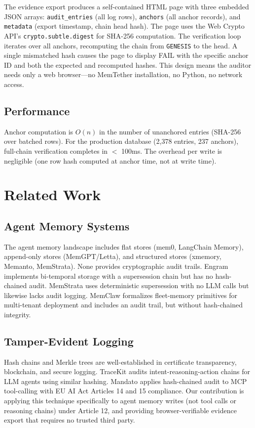 \documentclass[sigconf,nonacm]{acmart}
\begin{document}
The evidence export produces a self-contained HTML page with three embedded JSON arrays: \texttt{audit\_entries} (all log rows), \texttt{anchors} (all anchor records), and \texttt{metadata} (export timestamp, chain head hash). The page uses the Web Crypto API's \texttt{crypto.subtle.digest} for SHA-256 computation. The verification loop iterates over all anchors, recomputing the chain from \texttt{GENESIS} to the head. A single mismatched hash causes the page to display FAIL with the specific anchor ID and both the expected and recomputed hashes. This design means the auditor needs only a web browser---no MemTether installation, no Python, no network access.

\subsection{Performance}
Anchor computation is $O(n)$ in the number of unanchored entries (SHA-256 over batched rows). For the production database (2,378 entries, 237 anchors), full-chain verification completes in $<$ 100ms. The overhead per write is negligible (one row hash computed at anchor time, not at write time).

\section{Related Work}

\subsection{Agent Memory Systems}
The agent memory landscape includes flat stores (mem0, LangChain Memory), append-only stores (MemGPT/Letta), and structured stores (xmemory, Memanto, MemStrata). None provides cryptographic audit trails. Engram implements bi-temporal storage with a supersession chain but has no hash-chained audit. MemStrata uses deterministic supersession with no LLM calls but likewise lacks audit logging. MemClaw formalizes fleet-memory primitives for multi-tenant deployment and includes an audit trail, but without hash-chained integrity.

\subsection{Tamper-Evident Logging}
Hash chains and Merkle trees are well-established in certificate transparency, blockchain, and secure logging. TraceKit audits intent-reasoning-action chains for LLM agents using similar hashing. Mandato applies hash-chained audit to MCP tool-calling with EU AI Act Articles 14 and 15 compliance. Our contribution is applying this technique specifically to agent memory writes (not tool calls or reasoning chains) under Article 12, and providing browser-verifiable evidence export that requires no trusted third party.
\end{document}
